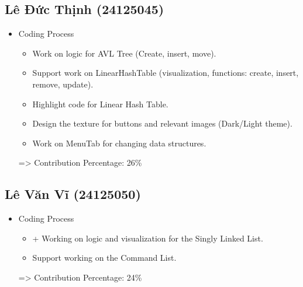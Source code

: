 \subsection{Lê Đức Thịnh (24125045)}
\begin{itemize}
    \item Coding Process    
    \begin{itemize}
        \item Work on logic for AVL Tree (Create, insert, move).
        \item Support work on LinearHashTable (visualization, functions: create, insert, remove, update).
        \item Highlight code for Linear Hash Table.
        \item Design the texture for buttons and relevant images (Dark/Light theme).
        \item Work on MenuTab for changing data structures.
    \end{itemize}
    => Contribution Percentage: 26\%
\end{itemize}

\subsection{Lê Văn Vĩ (24125050)}
\begin{itemize}
    \item Coding Process    
    \begin{itemize}
        \item + Working on logic and visualization for the Singly Linked List.
        \item Support working on the Command List.
    \end{itemize}
    => Contribution Percentage: 24\%
\end{itemize}